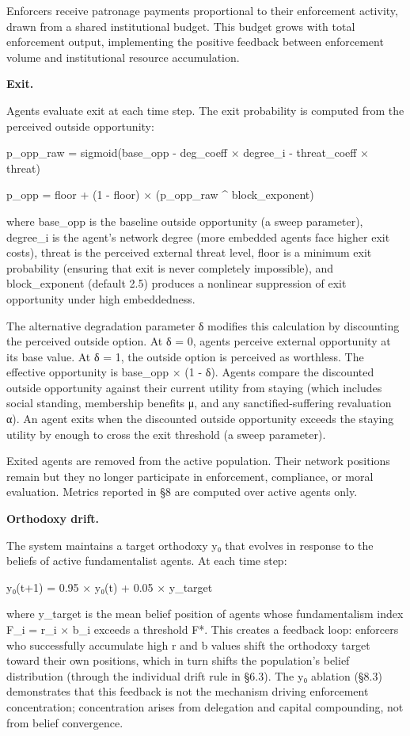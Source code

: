 \documentclass[12pt]{article}
\begin{document}
Enforcers receive patronage payments proportional to their enforcement activity, drawn from a shared institutional budget. This budget grows with total enforcement output, implementing the positive feedback between enforcement volume and institutional resource accumulation.

%

\textbf{Exit.}

Agents evaluate exit at each time step. The exit probability is computed from the perceived outside opportunity:

p\_opp\_raw = sigmoid(base\_opp - deg\_coeff × degree\_i - threat\_coeff × threat)

p\_opp = floor + (1 - floor) × (p\_opp\_raw \^{} block\_exponent)

where base\_opp is the baseline outside opportunity (a sweep parameter), degree\_i is the agent's network degree (more embedded agents face higher exit costs), threat is the perceived external threat level, floor is a minimum exit probability (ensuring that exit is never completely impossible), and block\_exponent (default 2.5) produces a nonlinear suppression of exit opportunity under high embeddedness.

The alternative degradation parameter δ modifies this calculation by discounting the perceived outside option. At δ = 0, agents perceive external opportunity at its base value. At δ = 1, the outside option is perceived as worthless. The effective opportunity is base\_opp × (1 - δ). Agents compare the discounted outside opportunity against their current utility from staying (which includes social standing, membership benefits μ, and any sanctified-suffering revaluation α). An agent exits when the discounted outside opportunity exceeds the staying utility by enough to cross the exit threshold (a sweep parameter).

Exited agents are removed from the active population. Their network positions remain but they no longer participate in enforcement, compliance, or moral evaluation. Metrics reported in §8 are computed over active agents only.

%

\textbf{Orthodoxy drift.}

The system maintains a target orthodoxy y₀ that evolves in response to the beliefs of active fundamentalist agents. At each time step:

y₀(t+1) = 0.95 × y₀(t) + 0.05 × y\_target

where y\_target is the mean belief position of agents whose fundamentalism index F\_i = r\_i × b\_i exceeds a threshold F*. This creates a feedback loop: enforcers who successfully accumulate high r and b values shift the orthodoxy target toward their own positions, which in turn shifts the population's belief distribution (through the individual drift rule in §6.3). The y₀ ablation (§8.3) demonstrates that this feedback is not the mechanism driving enforcement concentration; concentration arises from delegation and capital compounding, not from belief convergence.
\end{document}
